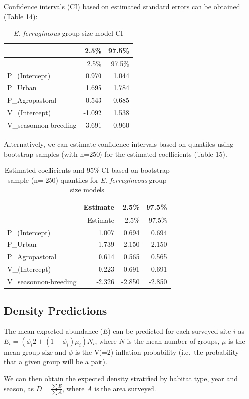\documentclass[]{article}
\begin{document}
Confidence intervals (CI) based on estimated standard errors can be
obtained (Table 14):

\begin{longtable}[]{@{}lrr@{}}
\caption{\textit{E. ferrugineous} group size model CI}\tabularnewline
\toprule
& 2.5\% & 97.5\%\tabularnewline
\midrule
\endfirsthead
\toprule
& 2.5\% & 97.5\%\tabularnewline
\midrule
\endhead
P\_(Intercept) & 0.970 & 1.044\tabularnewline
P\_Urban & 1.695 & 1.784\tabularnewline
P\_Agropastoral & 0.543 & 0.685\tabularnewline
V\_(Intercept) & -1.092 & 1.538\tabularnewline
V\_seasonnon-breeding & -3.691 & -0.960\tabularnewline
\bottomrule
\end{longtable}

Alternatively, we can estimate confidence intervals based on quantiles
using bootstrap samples (with n=250) for the estimated coefficients
(Table 15).

\begin{longtable}[]{@{}lrrr@{}}
\caption{Estimated coefficients and 95\% CI based on bootstrap sample
(n= 250) quantiles for \textit{E. ferrugineous} group size
models}\tabularnewline
\toprule
& Estimate & 2.5\% & 97.5\%\tabularnewline
\midrule
\endfirsthead
\toprule
& Estimate & 2.5\% & 97.5\%\tabularnewline
\midrule
\endhead
P\_(Intercept) & 1.007 & 0.694 & 0.694\tabularnewline
P\_Urban & 1.739 & 2.150 & 2.150\tabularnewline
P\_Agropastoral & 0.614 & 0.565 & 0.565\tabularnewline
V\_(Intercept) & 0.223 & 0.691 & 0.691\tabularnewline
V\_seasonnon-breeding & -2.326 & -2.850 & -2.850\tabularnewline
\bottomrule
\end{longtable}

\subsection{Density Predictions}\label{density-predictions}

The mean expected abundance (\(E\)) can be predicted for each surveyed
site \(i\) as \(E_{i} = (\phi_{i} 2 + (1 - \phi_{i})\mu_{i})N_{i}\),
where \(N\) is the mean number of groups, \(\mu\) is the mean group size
and \(\phi\) is the V(=2)-inflation probability (i.e.~the probability
that a given group will be a pair).

We can then obtain the expected density stratified by habitat type, year
and season, as \(D = \frac{\sum E}{\sum A}\), where \(A\) is the area
surveyed.
\end{document}
